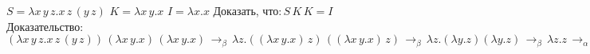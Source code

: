 \documentclass{article}
\begin{document}
$S = \lambda x\,y\,z.x\,z\,(y\,z)$
\newline
$K = \lambda x\,y.x$
\newline
$I = \lambda x.x$
\newline
Доказать, что:\,$S\,K\,K = I$
\newline
Доказательство:
\newline
$(\lambda x\,y\,z.x\,z\,(y\,z))\,(\lambda x\,y.x)\,(\lambda x\,y.x)\,\longrightarrow_\beta\,
\lambda z.((\lambda x\,y.x)\,z)\,((\lambda x\,y.x)\,z)\,\longrightarrow_\beta\,
\lambda z.(\lambda y.z)(\lambda y.z)\,\longrightarrow_\beta\,
\lambda z.z\,\longrightarrow_\alpha\,= I$
\end{document}
